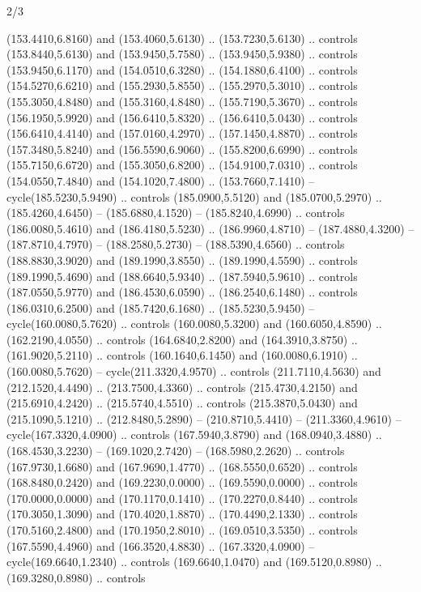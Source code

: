 \begin{flagdescription}{2/3}
\begin{scope}[xshift=0.5\flaglength,yshift=0.5\flagwidth,scale=\stretchfactor]
\begin{scope}[scale=0.001645\flagwidth,yshift=65mm,xshift=-63mm]
\begin{scope}[y=0.80pt, x=0.80pt, yscale=-1,]
\begin{scope}[cm={{1.33333,0.0,0.0,1.33333,(0.0,1e-05)}}]
  (153.4410,6.8160) and (153.4060,5.6130) .. (153.7230,5.6130) .. controls
  (153.8440,5.6130) and (153.9450,5.7580) .. (153.9450,5.9380) .. controls
  (153.9450,6.1170) and (154.0510,6.3280) .. (154.1880,6.4100) .. controls
  (154.5270,6.6210) and (155.2930,5.8550) .. (155.2970,5.3010) .. controls
  (155.3050,4.8480) and (155.3160,4.8480) .. (155.7190,5.3670) .. controls
  (156.1950,5.9920) and (156.6410,5.8320) .. (156.6410,5.0430) .. controls
  (156.6410,4.4140) and (157.0160,4.2970) .. (157.1450,4.8870) .. controls
  (157.3480,5.8240) and (156.5590,6.9060) .. (155.8200,6.6990) .. controls
  (155.7150,6.6720) and (155.3050,6.8200) .. (154.9100,7.0310) .. controls
  (154.0550,7.4840) and (154.1020,7.4800) .. (153.7660,7.1410) --
  cycle(185.5230,5.9490) .. controls (185.0900,5.5120) and (185.0700,5.2970) ..
  (185.4260,4.6450) -- (185.6880,4.1520) -- (185.8240,4.6990) .. controls
  (186.0080,5.4610) and (186.4180,5.5230) .. (186.9960,4.8710) --
  (187.4880,4.3200) -- (187.8710,4.7970) -- (188.2580,5.2730) --
  (188.5390,4.6560) .. controls (188.8830,3.9020) and (189.1990,3.8550) ..
  (189.1990,4.5590) .. controls (189.1990,5.4690) and (188.6640,5.9340) ..
  (187.5940,5.9610) .. controls (187.0550,5.9770) and (186.4530,6.0590) ..
  (186.2540,6.1480) .. controls (186.0310,6.2500) and (185.7420,6.1680) ..
  (185.5230,5.9450) -- cycle(160.0080,5.7620) .. controls (160.0080,5.3200) and
  (160.6050,4.8590) .. (162.2190,4.0550) .. controls (164.6840,2.8200) and
  (164.3910,3.8750) .. (161.9020,5.2110) .. controls (160.1640,6.1450) and
  (160.0080,6.1910) .. (160.0080,5.7620) -- cycle(211.3320,4.9570) .. controls
  (211.7110,4.5630) and (212.1520,4.4490) .. (213.7500,4.3360) .. controls
  (215.4730,4.2150) and (215.6910,4.2420) .. (215.5740,4.5510) .. controls
  (215.3870,5.0430) and (215.1090,5.1210) .. (212.8480,5.2890) --
  (210.8710,5.4410) -- (211.3360,4.9610) -- cycle(167.3320,4.0900) .. controls
  (167.5940,3.8790) and (168.0940,3.4880) .. (168.4530,3.2230) --
  (169.1020,2.7420) -- (168.5980,2.2620) .. controls (167.9730,1.6680) and
  (167.9690,1.4770) .. (168.5550,0.6520) .. controls (168.8480,0.2420) and
  (169.2230,0.0000) .. (169.5590,0.0000) .. controls (170.0000,0.0000) and
  (170.1170,0.1410) .. (170.2270,0.8440) .. controls (170.3050,1.3090) and
  (170.4020,1.8870) .. (170.4490,2.1330) .. controls (170.5160,2.4800) and
  (170.1950,2.8010) .. (169.0510,3.5350) .. controls (167.5590,4.4960) and
  (166.3520,4.8830) .. (167.3320,4.0900) -- cycle(169.6640,1.2340) .. controls
  (169.6640,1.0470) and (169.5120,0.8980) .. (169.3280,0.8980) .. controls

\end{scope}
\end{scope}
\end{scope}
\end{scope}
\end{flagdescription}
